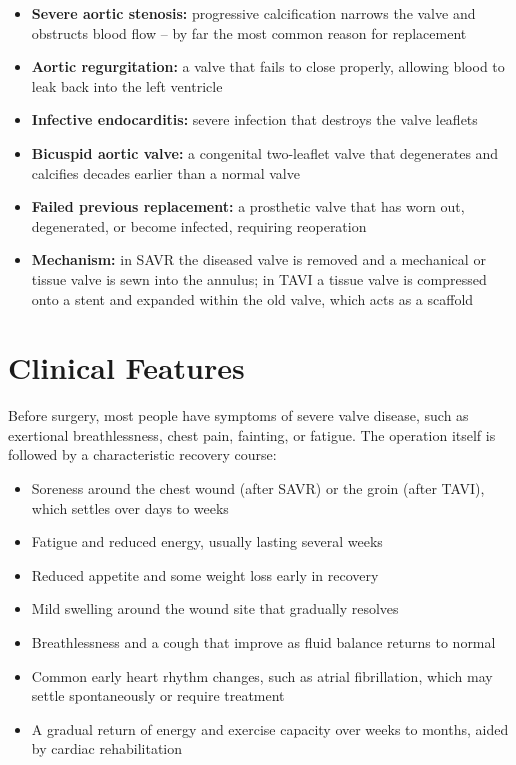 \begin{itemize}
    \item \textbf{Severe aortic stenosis:} progressive calcification narrows the valve and obstructs blood flow -- by far the most common reason for replacement
    \item \textbf{Aortic regurgitation:} a valve that fails to close properly, allowing blood to leak back into the left ventricle
    \item \textbf{Infective endocarditis:} severe infection that destroys the valve leaflets
    \item \textbf{Bicuspid aortic valve:} a congenital two-leaflet valve that degenerates and calcifies decades earlier than a normal valve
    \item \textbf{Failed previous replacement:} a prosthetic valve that has worn out, degenerated, or become infected, requiring reoperation
    \item \textbf{Mechanism:} in SAVR the diseased valve is removed and a mechanical or tissue valve is sewn into the annulus; in TAVI a tissue valve is compressed onto a stent and expanded within the old valve, which acts as a scaffold
\end{itemize}

\section*{Clinical Features}
Before surgery, most people have symptoms of severe valve disease, such as exertional breathlessness, chest pain, fainting, or fatigue. The operation itself is followed by a characteristic recovery course:

\begin{itemize}
    \item Soreness around the chest wound (after SAVR) or the groin (after TAVI), which settles over days to weeks
    \item Fatigue and reduced energy, usually lasting several weeks
    \item Reduced appetite and some weight loss early in recovery
    \item Mild swelling around the wound site that gradually resolves
    \item Breathlessness and a cough that improve as fluid balance returns to normal
    \item Common early heart rhythm changes, such as atrial fibrillation, which may settle spontaneously or require treatment
    \item A gradual return of energy and exercise capacity over weeks to months, aided by cardiac rehabilitation
\end{itemize}

